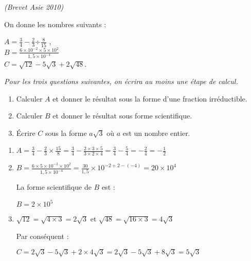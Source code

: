 
\textit{(Brevet Asie 2010)}
\par
On donne les nombres suivants :
\par
$A =\frac{3}{4}-\frac{2}{3}$÷$\frac{8}{15}$ , 
\\
$B =\frac{6\times 10^{-2} \times 5 \times 10^{2}}{1,5 \times 10^{-4}}\quad$  
\\ 
$C =\sqrt{12}-5\sqrt{3}+2\sqrt{48}$.
\par
\textit{Pour les trois questions suivantes, on écrira au moins une étape de calcul.}
\begin{enumerate}
     \item
     Calculer $A$ et donner le résultat sous la forme d'une fraction irréductible.
     \item
     Calculer $B$ et donner le résultat sous forme scientifique.
     \item
     Écrire $C$ sous la forme $a\sqrt{3}$ où $a$ est un nombre entier.
\end{enumerate}
\begin{corrige}
     \begin{enumerate}
          \item
          $A = \frac{3}{4}-\frac{2}{3}\times \frac{15}{8} = \frac{3}{4}-\frac{2\times 3\times 5}{3\times 2\times 4} $$= \frac{3}{4}-\frac{5}{4}=-\frac{2}{4} = -\frac{1}{2}$
\medskip
          \item
          $B = \frac{6 \times 5 \times 10^{-2} \times 10^{2}}{1,5 \times 10^{-4}} $$= \frac{30}{1,5}\times 10^{-2+2-\left(-4\right)} = 20\times 10^{4}$
          \par
          La forme scientifique de $B$ est :
          \par
          $B=2\times 10^{5}$
\medskip
          \item
          $\sqrt{12} = \sqrt{4\times 3}=2\sqrt{3} $  et  $ \sqrt{48} = \sqrt{16\times 3}=4\sqrt{3}$
          \par
          Par conséquent :
          \par
          $C = 2\sqrt{3}-5\sqrt{3}+2\times 4\sqrt{3}$$= 2\sqrt{3}-5\sqrt{3}+8\sqrt{3} =5\sqrt{3}$
     \end{enumerate}
\end{corrige}

